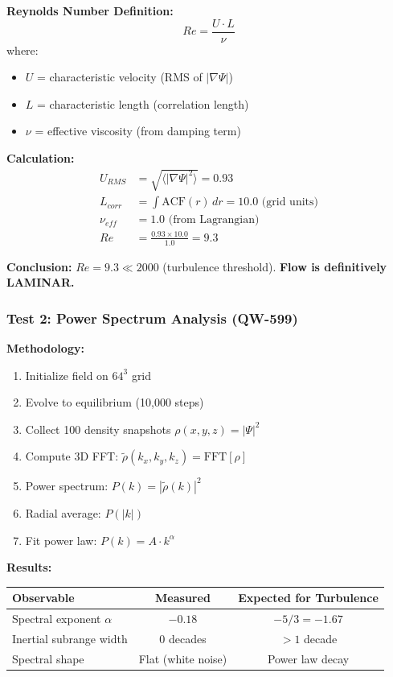 \documentclass[11pt, a4paper]{article}
\theoremstyle{remark}
\begin{document}
\textbf{Reynolds Number Definition:}
\begin{equation}
Re = \frac{U \cdot L}{\nu}
\end{equation}
where:
\begin{itemize}
    \item $U$ = characteristic velocity (RMS of $|\nabla\Psi|$)
    \item $L$ = characteristic length (correlation length)
    \item $\nu$ = effective viscosity (from damping term)
\end{itemize}

\textbf{Calculation:}
\begin{align}
U_{RMS} &= \sqrt{\langle|\nabla\Psi|^2\rangle} = 0.93 \\
L_{corr} &= \int \text{ACF}(r) \, dr = 10.0 \text{ (grid units)} \\
\nu_{eff} &= 1.0 \text{ (from Lagrangian)} \\
Re &= \frac{0.93 \times 10.0}{1.0} = \boxed{9.3}
\end{align}

\textbf{Conclusion:} $Re = 9.3 \ll 2000$ (turbulence threshold). \textbf{Flow is definitively LAMINAR.}

\subsubsection{Test 2: Power Spectrum Analysis (QW-599)}

\textbf{Methodology:}
\begin{enumerate}
    \item Initialize field on $64^3$ grid
    \item Evolve to equilibrium (10,000 steps)
    \item Collect 100 density snapshots $\rho(x,y,z) = |\Psi|^2$
    \item Compute 3D FFT: $\tilde{\rho}(k_x, k_y, k_z) = \text{FFT}[\rho]$
    \item Power spectrum: $P(k) = |\tilde{\rho}(k)|^2$
    \item Radial average: $P(|k|)$
    \item Fit power law: $P(k) = A \cdot k^\alpha$
\end{enumerate}

\textbf{Results:}
\begin{table}[H]
\centering
\begin{tabular}{|l|c|c|}
\hline
\textbf{Observable} & \textbf{Measured} & \textbf{Expected for Turbulence} \\
\hline
Spectral exponent $\alpha$ & $-0.18$ & $-5/3 = -1.67$ \\
Inertial subrange width & 0 decades & $>1$ decade \\
Spectral shape & Flat (white noise) & Power law decay \\
\hline
\end{tabular}
\end{table}
\end{document}

